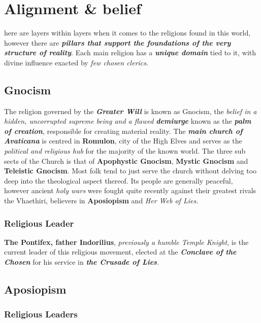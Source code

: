\section{Alignment \& belief}

here are layers within layers when it comes to the religions found in this world,
however there are \textit{\textbf{pillars that support the foundations of the very structure of reality}}. Each main religion has a \textbf{\textit{unique domain}} tied to it, with divine influence exacted by \textit{few chosen clerics}.

\subsection{Gnocism}

The religion governed by the \textit{\textbf{Greater Will}} is known as Gnocism, the \textit{belief in a hidden, uncorrupted supreme being and a flawed \textbf{demiurge}} known as the \textit{\textbf{palm of creation}}, responsible for creating material reality. The \textit{\textbf{main church of Avaticana}} is centred in \textbf{Romulon}, city of the High Elves and serves as the \textit{political and religious hub} for the majority of the known world. The three sub sects of the Church is that of\textbf{ Apophystic Gnocism}, \textbf{Mystic Gnocism }and \textbf{Teleistic Gnocism}. Most folk tend to just serve the church without delving too deep into the theological aspect thereof. Its people are generally peaceful, however ancient \textit{holy wars} were fought quite recently against their greatest rivals the Vhaethiri, believers in \textbf{Aposiopism} and \textit{Her Web of Lies.}

\subsubsection{Religious Leader}
\textbf{The Pontifex, father Indorilius}, \textit{previously a humble Temple Knight}, is the current leader of this religious movement, elected at the \textit{\textbf{Conclave of the Chosen }}for his service in \textit{\textbf{the Crusade of Lies}}.

\subsection{Aposiopism}


\subsubsection{Religious Leaders}


